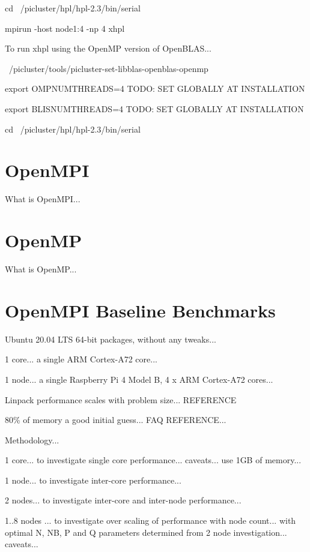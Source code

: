 \documentclass{article}
\begin{document}
cd ~/picluster/hpl/hpl-2.3/bin/serial

mpirun -host node1:4 -np 4 xhpl



To run xhpl using the OpenMP version of OpenBLAS...

~/picluster/tools/picluster-set-libblas-openblas-openmp

export OMPNUMTHREADS=4 TODO: SET GLOBALLY AT INSTALLATION

export BLISNUMTHREADS=4 TODO: SET GLOBALLY AT INSTALLATION

cd ~/picluster/hpl/hpl-2.3/bin/serial



\section{OpenMPI}

What is OpenMPI...



\section{OpenMP}

What is OpenMP...



\section{OpenMPI Baseline Benchmarks}

Ubuntu 20.04 LTS 64-bit packages, without any tweaks...

1 core... a single ARM Cortex-A72 core...

1 node... a single Raspberry Pi 4 Model B, 4 x ARM Cortex-A72 cores...

Linpack performance scales with problem size... REFERENCE

80\% of memory a good initial guess... FAQ REFERENCE...


Methodology...

1 core... to investigate single core performance... caveats... use 1GB of memory...

1 node... to investigate inter-core performance...

2 nodes... to investigate inter-core and inter-node performance...

1..8 nodes ... to investigate over scaling of performance with node count... with optimal N, NB, P and Q parameters determined from 2 node investigation... caveats...
\end{document}
